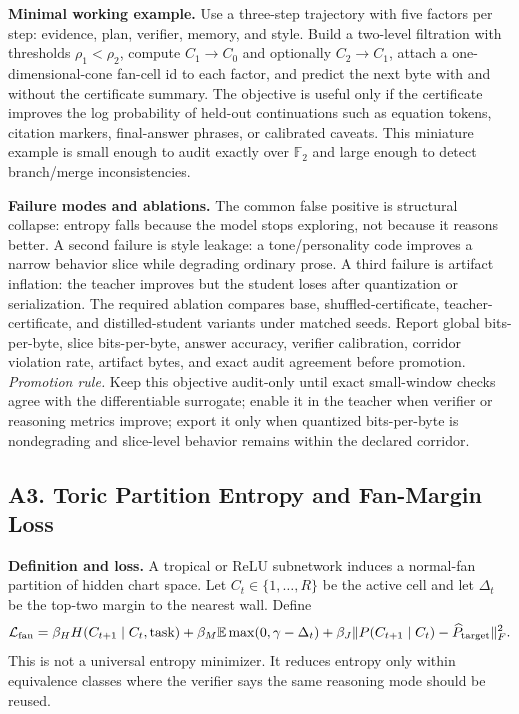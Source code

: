 \documentclass[10pt]{article}
\newcommand{\FF}{\mathbb{F}}
\newcommand{\loss}{\mathcal{L}}
\numberwithin{equation}{section}
\begin{document}
\noindent\textbf{Minimal working example.} Use a three-step trajectory with five factors per step: evidence, plan, verifier, memory, and style. Build a two-level filtration with thresholds $\rho_1<\rho_2$, compute $C_1\to C_0$ and optionally $C_2\to C_1$, attach a one-dimensional-cone fan-cell id to each factor, and predict the next byte with and without the certificate summary. The objective is useful only if the certificate improves the log probability of held-out continuations such as equation tokens, citation markers, final-answer phrases, or calibrated caveats. This miniature example is small enough to audit exactly over $\FF_2$ and large enough to detect branch/merge inconsistencies.

\noindent\textbf{Failure modes and ablations.} The common false positive is structural collapse: entropy falls because the model stops exploring, not because it reasons better. A second failure is style leakage: a tone/personality code improves a narrow behavior slice while degrading ordinary prose. A third failure is artifact inflation: the teacher improves but the student loses after quantization or serialization. The required ablation compares base, shuffled-certificate, teacher-certificate, and distilled-student variants under matched seeds. Report global bits-per-byte, slice bits-per-byte, answer accuracy, verifier calibration, corridor violation rate, artifact bytes, and exact audit agreement before promotion.
\vfill
\noindent\emph{Promotion rule.} Keep this objective audit-only until exact small-window checks agree with the differentiable surrogate; enable it in the teacher when verifier or reasoning metrics improve; export it only when quantized bits-per-byte is nondegrading and slice-level behavior remains within the declared corridor.
\clearpage
\subsection{A3. Toric Partition Entropy and Fan-Margin Loss}
\noindent\textbf{Definition and loss.} A tropical or ReLU subnetwork induces a normal-fan partition of hidden chart space. Let $C_t\in\{1,\ldots,R\}$ be the active cell and let $\Delta_t$ be the top-two margin to the nearest wall. Define
\[
\loss_{\rm fan}=\beta_H H(C_{t+1}\mid C_t,\mathrm{task})+\beta_M\mathbb E\max(0,\gamma-\Delta_t)+\beta_J\|P(C_{t+1}\mid C_t)-\widehat P_{\rm target}\|_F^2.
\]
This is not a universal entropy minimizer. It reduces entropy only within equivalence classes where the verifier says the same reasoning mode should be reused.
\end{document}
